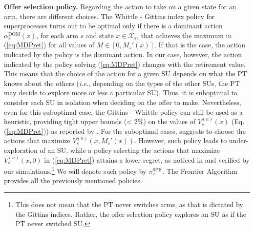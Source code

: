\textbf{Offer selection policy.} Regarding the action to take on a given state for an arm, there are different choices.
The Whittle - Gittins index policy for superprocesses turns out to be optimal only if there is a dominant action $\alpha_s^{\text{DOM}}(x)$, for each arm $s$ and state $x \in \mathcal{X}_s$, that achieves the maximum in (\ref{eq:MDPret}) for all values of $M \in [0,M_s'(x)]$. 
If that is the case, the action indicated by the policy is the dominant action. In our case, however, the action indicated by the policy solving (\ref{eq:MDPret}) changes with the retirement value. 
This means that the choice of the action for a given SU depends on what the PT knows about the others (\textit{i.e.,} depending on the types of the other SUs, the PT may decide to explore more or less a particular SU). Thus, it is suboptimal to consider each SU in isolation when deciding on the offer to make.
Nevertheless, even for this suboptimal case, the Gittins - Whittle policy can still be used as a heuristic, providing tight upper bounds (< 2\%) on the values of $V_s^{(n)}(x)$ (Eq. (\ref{eq:MDPret})) as reported by \cite{ref:Brown2013}.
For the suboptimal cases, \cite{ref:Pandey2007} suggests to choose the actions that maximize $V_s^{(n)}(x, M_s'(x))$. However, such policy leads to under-exploration of an SU, while a policy selecting the actions that maximize $V_s^{(n)}(x,0)$ in (\ref{eq:MDPret}) attains a lower regret, as noticed in \cite{ref:Brown2013} and verified by our simulations.\footnote{This does not mean that the PT never switches arms, as that is dictated by the Gittins indices. Rather, the offer selection policy explores an SU as if the PT never switched SU.} We will denote such policy by $\pi_s^{\text{SPR}}$. The Frontier Algorithm provides all the previously mentioned policies. 


